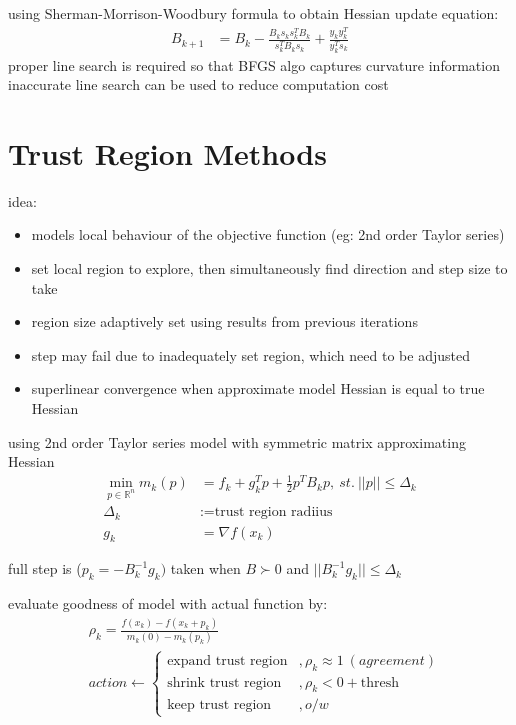\documentclass[8pt,letter]{article}
\newcommand{\R}{\mathbb{R}}
\begin{document}
\begin{multicols*}{2}
  using Sherman-Morrison-Woodbury formula to obtain Hessian update equation:
  \begin{align*}
    B_{k+1} & = B_k - \frac{B_ks_k s_k^T B_k}{s_k^T B_k s_k} + \frac{y_k y_k^T}{y_k^T s_k}
  \end{align*}
  proper line search is required so that BFGS algo captures curvature information\\
  
  inaccurate line search can be used to reduce computation cost
  \vfill\null
  
  \pagebreak
  
  \section{Trust Region Methods}
  idea:
  \begin{itemize}
  \item models local behaviour of the objective function (eg: 2nd order Taylor series)
  \item set local region to explore, then simultaneously find direction and step size to take
  \item region size adaptively set using results from previous iterations
  \item step may fail due to inadequately set region, which need to be adjusted
  \item superlinear convergence when approximate model Hessian is equal to true Hessian
  \end{itemize}

  using 2nd order Taylor series model with symmetric matrix approximating Hessian
  \begin{align*}
    \min_{p \in \R^n} m_k(p) & = f_k + g_k^Tp + \frac{1}{2}p^TB_kp,\ st.\ ||p||\leq \Delta_k\\
    \Delta_k & :=\text{trust region radiius}\\
    g_k & =\nabla f(x_k)
  \end{align*}
  
  full step is ($p_k=-B_k^{-1}g_k)$ taken when $B\succ 0 $ and $||B_k^{-1} g_k|| \leq \Delta_k$

  evaluate goodness of model with actual function by:
  \begin{align*}
    &\rho_k = \frac{f(x_k)-f(x_k+p_k)}{m_k(0)-m_k(p_k)}\\
    &action \leftarrow
      \begin{cases}
        \text{expand trust region} &, \rho_k \approx 1\ (agreement)\\
        \text{shrink trust region} &, \rho_k  < 0 + \text{thresh}\\
        \text{keep trust region} &, o/w
      \end{cases}  
  \end{align*}


\end{multicols*}
\end{document}
